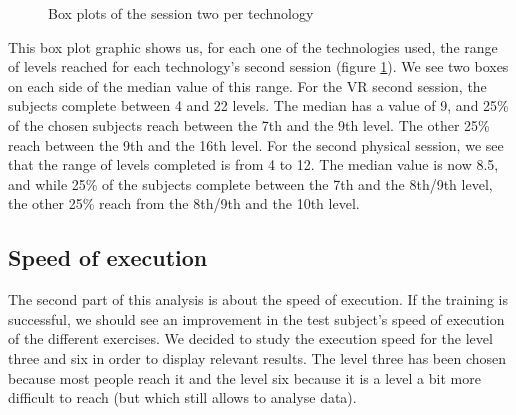 \documentclass[12pt, openany, twocolumn]{article}
\begin{document}
                \begin{figure}[H]
                    \centering
                    \setlength{\fboxsep}{0pt}
                    \caption{Box plots of the session two per technology}
                    \label{figure18}
                \end{figure}

            This box plot graphic shows us, for each one of the technologies used, the range of levels reached for each technology's second session (figure \ref{figure18}). We see two boxes on each side of the median value of this range.
            For the VR second session, the subjects complete between 4 and 22 levels. The median has a value of 9, and 25\% of the chosen subjects reach between the 7th and the 9th level. The other 25\% reach between the 9th and the 16th level.
            For the second physical session, we see that the range of levels completed is from 4 to 12. The median value is now 8.5, and while 25\% of the subjects complete between the 7th and the 8th/9th level, the other 25\% reach from the 8th/9th and the 10th level.

    \subsection{Speed of execution}
    The second part of this analysis is about the speed of execution.
    If the training is successful, we should see an improvement in the test subject's speed of execution of the different exercises. We decided to study the execution speed for the level three and six in order to display relevant results. The level three has been chosen because most people reach it and the level six because it is a level a bit more difficult to reach (but which still allows to analyse data). 
\end{document}
